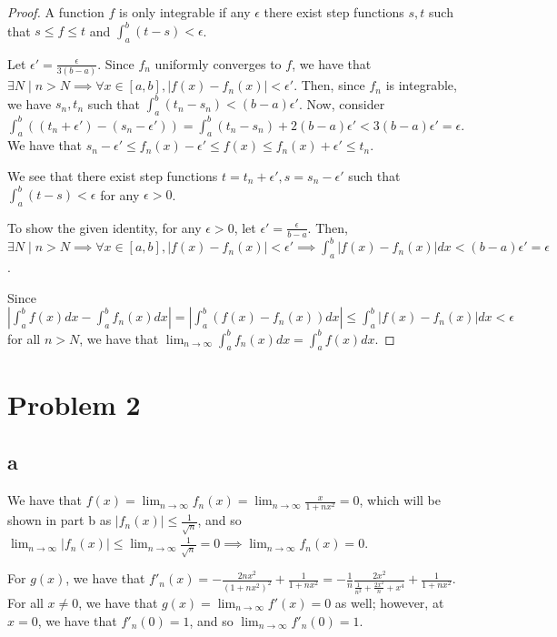 \documentclass[12pt,letterpaper]{article}
\theoremstyle{definition}
\begin{document}
\begin{proof}
  A function $f$ is only integrable if any $\epsilon$ there exist step functions $s,t$ such
  that $s \leq f \leq t$ and $\int_a^b(t-s) < \epsilon$.
  
  Let $\epsilon' = \frac{\epsilon}{3(b-a)}$. Since $f_n$ uniformly converges to
  $f$, we have that $\exists N \mid n > N \implies \forall x \in [a,b], |f(x) -
  f_n(x)| < \epsilon'$. Then, since $f_n$ is integrable, we have $s_n, t_n$ such
  that $\int_a^b(t_n - s_n) < (b - a)\epsilon'$. Now, consider $\int_a^b((t_n +
  \epsilon') - (s_n - \epsilon')) = \int_a^b(t_n  - s_n) + 2(b-a)\epsilon' <
  3(b-a)\epsilon' = \epsilon$. We have that $s_n - \epsilon' \leq f_n(x) - \epsilon' \leq
  f(x) \leq f_n(x) + \epsilon' \leq t_n$. 

  We see that there exist step
  functions $t = t_n + \epsilon', s = s_n - \epsilon'$ such that $\int_a^b(t -
  s) < \epsilon$ for any $\epsilon > 0$.

  To show the given identity, for any $\epsilon > 0$, let
  $\epsilon' = \frac{\epsilon}{b-a}$. Then, $\exists N \mid n > N \implies \forall x \in [a,b],
  |f(x) - f_n(x)| < \epsilon' \implies \int_a^b|f(x) - f_n(x)|dx < (b -
  a)\epsilon' = \epsilon$.

  Since $\left| \int_a^bf(x)dx - \int_a^bf_n(x)dx
  \right| = |\int_a^b(f(x) - f_n(x))dx| \leq \int_a^b|f(x) - f_n(x)|dx <
  \epsilon$ for all $n > N$, we have that $\lim_{n\rightarrow \infty} \int_a^b
  f_n(x)dx = \int_a^bf(x)dx$.
\end{proof}

\section*{Problem 2}

\subsection*{a}

We have that $f(x) = \lim_{n\rightarrow \infty} f_n(x) = \lim_{n\rightarrow
  \infty} \frac{x}{1 + nx^2} = 0$, which will be shown in part b as $|f_n(x)|
\leq \frac{1}{\sqrt{n}}$, and so $\lim_{n\rightarrow \infty} |f_n(x)| \leq
\lim_{n\rightarrow \infty}\frac{1}{\sqrt{n}} = 0 \implies \lim_{n\rightarrow
  \infty} f_n(x) = 0$.

For $g(x)$, we have that $f'_n(x) = -\frac{2 n x^2}{(1 + n x^2)^2} + \frac{1}{1
  + n x^2} = -\frac{1}{n}\frac{2x^2}{\frac{1}{n^2} + \frac{2x^2}{n} + x^4} + \frac{1}{1+nx^2}$. For
all $x \neq 0$, we have that $g(x) = \lim_{n\rightarrow \infty} f'(x) = 0$ as
well; however, at $x = 0$, we have that $f'_n(0) =
1$, and so $\lim_{n\rightarrow \infty} f'_n(0) = 1$.
\end{document}
